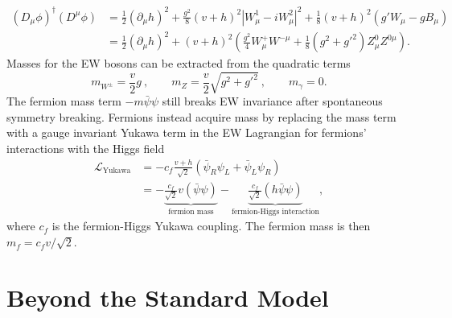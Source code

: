 \documentclass[../thesis.tex]{subfiles}
\begin{document}
\begin{equation}
\begin{aligned}
\left(D_\mu\phi\right)^\dagger \left(D^\mu\phi\right) 
&= \frac{1}{2}(\partial_\mu h)^2 + \frac{g^2}{8}(v+h)^2\left|W^1_\mu -iW^2_\mu\right|^2 + \frac{1}{8}(v+h)^2\left(g'W_\mu-gB_\mu\right) \\
&= \frac{1}{2}(\partial_\mu h)^2 + (v+h)^2 \left( \frac{g^2}{4}W^{+}_{\mu} W^{-\mu }+\frac{1}{8} \left(g^2+g'^2\right)Z^{0}_{\mu} Z^{0\mu} \right).
\end{aligned}
\end{equation}
Masses for the \acs{EW} bosons can be extracted from the quadratic terms
\begin{equation}
m_{W^\pm} = \frac{v}{2}g\:, \qquad m_Z = \frac{v}{2}\sqrt{g^2+g'^2}\:, \qquad m_\gamma = 0.
\end{equation}
The fermion mass term $-m\bar{\psi}\psi$ still breaks \acs{EW} invariance after spontaneous symmetry breaking. Fermions instead acquire mass by replacing the mass term with a gauge invariant Yukawa term in the \acs{EW} Lagrangian for fermions' interactions with the Higgs field \citep{theory:higgs_physics}
\begin{equation}
\begin{aligned}
\mathcal{L}_\text{Yukawa} 
&= -c_f\frac{v+h}{\sqrt{2}}\left(\bar{\psi}_R\psi_L+\bar{\psi}_L\psi_R\right) \\
&=
- \underbrace{\frac{c_f}{\sqrt{2}}v(\bar{\psi}\psi)}_\text{fermion mass}
- \underbrace{\frac{c_f}{\sqrt{2}}(h\bar{\psi}\psi)}_\text{fermion-Higgs interaction},
\end{aligned}
\end{equation}
where $c_f$ is the fermion-Higgs Yukawa coupling. The fermion mass is then $m_f = c_f v/\sqrt{2}$.

\section{Beyond the Standard Model}
\end{document}
